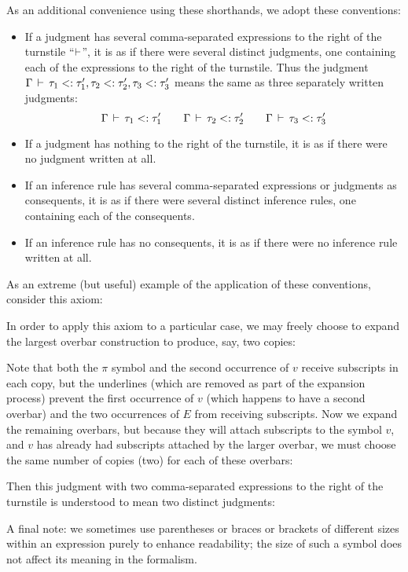 As an additional convenience using these shorthands, we adopt these conventions:
\begin{itemize}
\item If a judgment has several comma-separated expressions to the right of the turnstile ``$\vdash$'', it is
as if there were several distinct judgments, one containing each of the expressions to the right of the turnstile.
Thus the judgment $\jgTHREEtemplate{\Gamma}{\tau_1}{\extends}{\tau'_1}{\tau_2}{\tau'_2}{\tau_3}{\tau'_3}$
means the same as three separately written judgments:
\[\jgtemplate[\Gamma]{\tau_1}{\extends}{\tau'_1} \andalso \jgtemplate[\Gamma]{\tau_2}{\extends}{\tau'_2} \andalso \jgtemplate[\Gamma]{\tau_3}{\extends}{\tau'_3} \]
\item If a judgment has nothing to the right of the turnstile, it is
as if there were no judgment written at all.
\item If an inference rule has several comma-separated expressions or judgments as consequents, it is
as if there were several distinct inference rules, one containing each of the consequents.
\item If an inference rule has no consequents, it is
as if there were no inference rule written at all.
\end{itemize}

As an extreme (but useful) example of the application of these conventions, consider this axiom:


\noindent In order to apply this axiom to a particular case, we may freely choose to expand the largest overbar construction to produce, say, two copies:


\noindent Note that both the $\pi$ symbol and the second occurrence of $v$ receive subscripts in each copy, but the underlines (which are removed as part of the expansion process) prevent the first occurrence of $v$ (which happens to have a second overbar) and the two occurrences of $E$ from receiving subscripts.  Now we expand the remaining overbars, but because they will attach subscripts to the symbol $v$, and $v$ has already had subscripts attached by the larger overbar, we must choose the same number of copies (two) for each of these overbars:


\noindent Then this judgment with two comma-separated expressions to the right of the turnstile is understood to mean two distinct judgments:


A final note: we sometimes use parentheses or braces or brackets of different sizes within an expression purely to enhance readability;
the size of such a symbol does not affect its meaning in the formalism.
